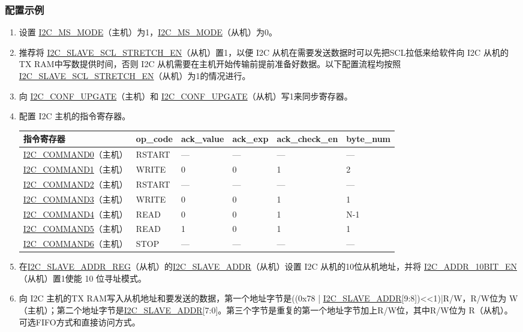 \documentclass[main\_\_CN.tex]{subfiles}
\begin{document}
\subsubsection{配置示例}
\begin{enumerate}
\item 设置 \hyperref[fielddesc:I2CMSMODE]{I2C\_MS\_MODE}（主机）为1，\hyperref[fielddesc:I2CMSMODE]{I2C\_MS\_MODE}（从机）为0。
\item 推荐将 \hyperref[fielddesc:I2CSLAVESCLSTRETCHEN]{I2C\_SLAVE\_SCL\_STRETCH\_EN}（从机）置1，以便 I2C 从机在需要发送数据时可以先把SCL拉低来给软件向 I2C 从机的TX RAM中写数提供时间，否则 I2C 从机需要在主机开始传输前提前准备好数据。以下配置流程均按照\hyperref[fielddesc:I2CSLAVESCLSTRETCHEN]{I2C\_SLAVE\_SCL\_STRETCH\_EN}（从机）为1的情况进行。
\item 向 \hyperref[fielddesc:I2CCONFUPGATE]{I2C\_CONF\_UPGATE}（主机）和 \hyperref[fielddesc:I2CCONFUPGATE]{I2C\_CONF\_UPGATE}（从机）写1来同步寄存器。
\item 配置 I2C 主机的指令寄存器。
\begin{longtable}{ | p{4cm} | p{2cm} | p{2cm} | p{2cm} |p{2cm} | p{2cm} |}
\hline\rowcolor{lightgray}
指令寄存器& op\_code & ack\_value&ack\_exp&ack\_check\_en&byte\_num  \\ \hline
\hyperref[fielddesc:I2CCOMMAND0]{I2C\_COMMAND0}（主机）& RSTART& ---&---&---&---  \\ \hline
\hyperref[fielddesc:I2CCOMMAND1]{I2C\_COMMAND1}（主机）& WRITE& 0&0&1&2  \\ \hline
\hyperref[fielddesc:I2CCOMMAND2]{I2C\_COMMAND2}（主机）& RSTART& ---&---&---&---  \\ \hline
\hyperref[fielddesc:I2CCOMMAND3]{I2C\_COMMAND3}（主机）& WRITE& 0&0&1&1  \\ \hline
\hyperref[fielddesc:I2CCOMMAND4]{I2C\_COMMAND4}（主机）& READ& 0&0&1&N-1  \\ \hline
\hyperref[fielddesc:I2CCOMMAND5]{I2C\_COMMAND5}（主机）& READ& 1&0&1&1  \\ \hline
\hyperref[fielddesc:I2CCOMMAND6]{I2C\_COMMAND6}（主机）& STOP& ---&---&---&---  \\ \hline
\end{longtable}

\item 在\hyperref[regdesc:I2CSLAVEADDRREG]{I2C\_SLAVE\_ADDR\_REG}（从机）的\hyperref[fielddesc:I2CSLAVEADDR]{I2C\_SLAVE\_ADDR}（从机）设置 I2C 从机的10位从机地址，并将 \hyperref[fielddesc:I2CADDR10BITEN]{I2C\_ADDR\_10BIT\_EN}（从机）置1使能 10 位寻址模式。
\item 向 I2C 主机的TX RAM写入从机地址和要发送的数据，第一个地址字节是((0x{}78 | \hyperref[fielddesc:I2CSLAVEADDR]{I2C\_SLAVE\_ADDR}[9:8])<<1)|R/W，R/W位为 W（主机）；第二个地址字节是\hyperref[fielddesc:I2CSLAVEADDR]{I2C\_SLAVE\_ADDR}[7:0]。第三个字节是重复的第一个地址字节加上R/W位，其中R/W位为 R（从机）。可选FIFO方式和直接访问方式。


\end{enumerate}
\end{document}
